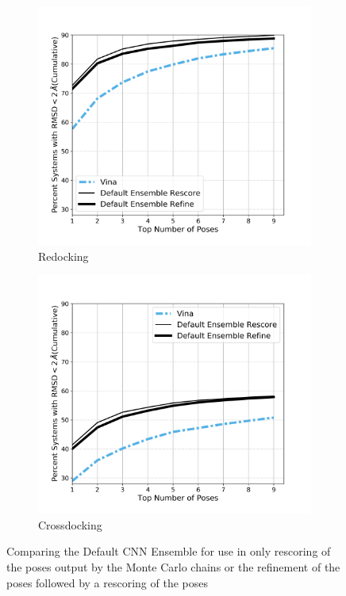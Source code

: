 \documentclass[journal=jcisd8,manuscript=article]{achemso}
\begin{document}
\begin{figure}    
        \begin{subfigure}[b]{0.48\textwidth}    
		\centering
		\includegraphics[width=\textwidth]{figures/redocking/rescore_vs_refine_line.png} 
		\caption{Redocking}
		\label{fig:CompareRescoreRefineRedock}
        \end{subfigure}    
        \begin{subfigure}[b]{0.48\textwidth}    
		\centering
		\includegraphics[width=\textwidth]{figures/crossdocking/rescore_vs_refine_line.png} 
		\caption{Crossdocking}
		\label{fig:CompareRescoreRefineCrossdock}
        \end{subfigure}    
	\caption{Comparing the Default CNN Ensemble for use in only rescoring of the poses output by the Monte Carlo chains or the refinement of the poses followed by a rescoring of the poses}
	\label{fig:CompareRescoreRefine}
\end{figure}    
\end{document}
